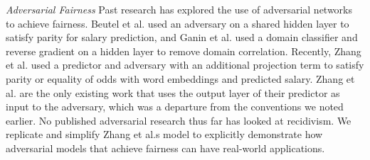 \documentclass{article}
\begin{document}
\textit{Adversarial Fairness} Past research has explored the use of adversarial networks to achieve fairness. Beutel et al.  used an adversary on a shared hidden layer to satisfy parity for salary prediction, and Ganin et al.  used a domain classifier and reverse gradient on a hidden layer to remove domain correlation. Recently, Zhang et al.  used a predictor and adversary with an additional projection term to satisfy parity or equality of odds with word embeddings and predicted salary. Zhang et al. are the only existing work that uses the output layer of their predictor as input to the adversary, which was a departure from the conventions we noted earlier. No published adversarial research thus far has looked at recidivism. We replicate and simplify Zhang et al.\textquotesingle s model to explicitly demonstrate how adversarial models that achieve fairness can have real-world applications.
\end{document}
